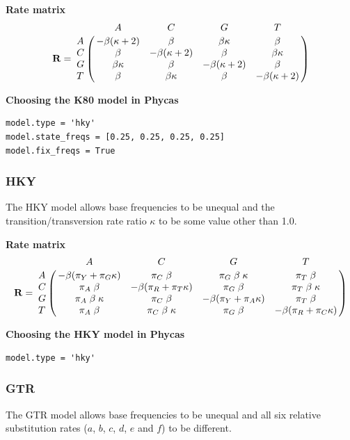 \documentclass[10pt]{article}
\begin{document}
\begin{samepage}
{\bf Rate matrix}
$${\bf R} = \bordermatrix{ &         A          &         C          &        G          &         T          \cr
                         A & -\beta(\kappa + 2) &  \beta             &  \beta \kappa     &  \beta             \cr
                         C &  \beta             & -\beta(\kappa + 2) &  \beta            &  \beta \kappa      \cr
                         G &  \beta \kappa      &  \beta             & -\beta(\kappa + 2)&  \beta             \cr
                         T &  \beta             &  \beta \kappa      &  \beta            & -\beta(\kappa + 2) \cr}$$
\end{samepage}

\begin{samepage}
{\bf Choosing the K80 model in Phycas}
\begin{verbatim}
model.type = 'hky'
model.state_freqs = [0.25, 0.25, 0.25, 0.25]
model.fix_freqs = True
\end{verbatim}
\end{samepage}

\subsubsection{HKY}
The HKY model \citep{HasegawaKishinoYano1985} allows base frequencies to be unequal and the transition/transversion rate ratio $\kappa$ to be some value other than 1.0.

\begin{samepage}
{\bf Rate matrix}
$${\bf R} = \bordermatrix{ &       A      &       C       &       G       &       T       \cr
A & -\beta (\pi_Y + \pi_G \kappa) & \pi_C \; \beta  & \pi_G \; \beta \; \kappa  & \pi_T \; \beta  \cr
C & \pi_A \; \beta & -\beta (\pi_R + \pi_T \kappa) & \pi_G \; \beta  & \pi_T \; \beta \; \kappa  \cr
G & \pi_A \; \beta \; \kappa & \pi_C \; \beta  & -\beta (\pi_Y + \pi_A \kappa) & \pi_T \; \beta  \cr
T & \pi_A \; \beta & \pi_C \; \beta \; \kappa  & \pi_G \; \beta  & -\beta (\pi_R + \pi_C \kappa) \cr}$$
\end{samepage}

\begin{samepage}
{\bf Choosing the HKY model in Phycas}
\begin{verbatim}
model.type = 'hky'
\end{verbatim}
\end{samepage}

\subsubsection{GTR}
The GTR model \citep{LanavePreparataSacconeSerio1984} allows base frequencies to be unequal and all six relative substitution rates ($a$, $b$, $c$, $d$, $e$ and $f$) to be different.
\end{document}
